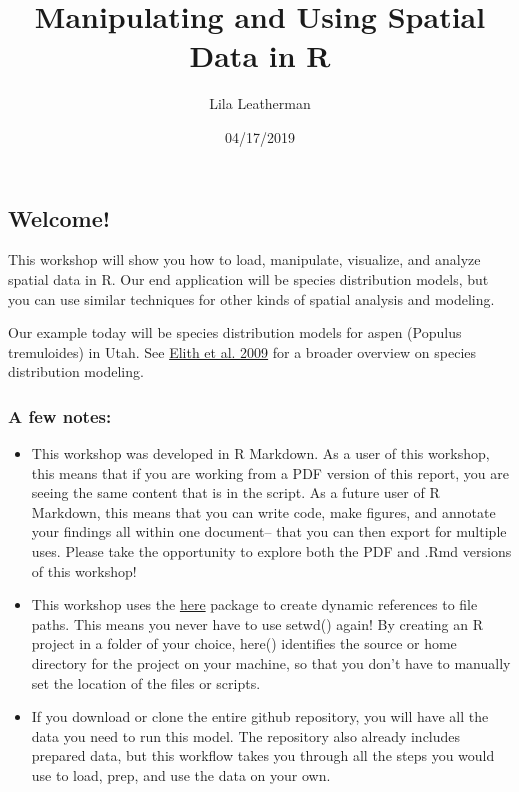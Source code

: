 \documentclass[]{article}
\title{Manipulating and Using Spatial Data in R}
\author{Lila Leatherman}
\date{04/17/2019}
\begin{document}
\maketitle

\subsection{Welcome!}\label{welcome}

This workshop will show you how to load, manipulate, visualize, and
analyze spatial data in R. Our end application will be species
distribution models, but you can use similar techniques for other kinds
of spatial analysis and modeling.

Our example today will be species distribution models for aspen (Populus
tremuloides) in Utah. See
\href{https://www.annualreviews.org/doi/abs/10.1146/annurev.ecolsys.110308.120159}{Elith
et al. 2009} for a broader overview on species distribution modeling.

\subsubsection{A few notes:}\label{a-few-notes}

\begin{itemize}
\item
  This workshop was developed in R Markdown. As a user of this workshop,
  this means that if you are working from a PDF version of this report,
  you are seeing the same content that is in the script. As a future
  user of R Markdown, this means that you can write code, make figures,
  and annotate your findings all within one document-- that you can then
  export for multiple uses. Please take the opportunity to explore both
  the PDF and .Rmd versions of this workshop!
\item
  This workshop uses the
  \href{https://github.com/jennybc/here_here}{here} package to create
  dynamic references to file paths. This means you never have to use
  setwd() again! By creating an R project in a folder of your choice,
  here() identifies the source or home directory for the project on your
  machine, so that you don't have to manually set the location of the
  files or scripts.
\item
  If you download or clone the entire github repository, you will have
  all the data you need to run this model. The repository also already
  includes prepared data, but this workflow takes you through all the
  steps you would use to load, prep, and use the data on your own.
\end{itemize}
\end{document}
